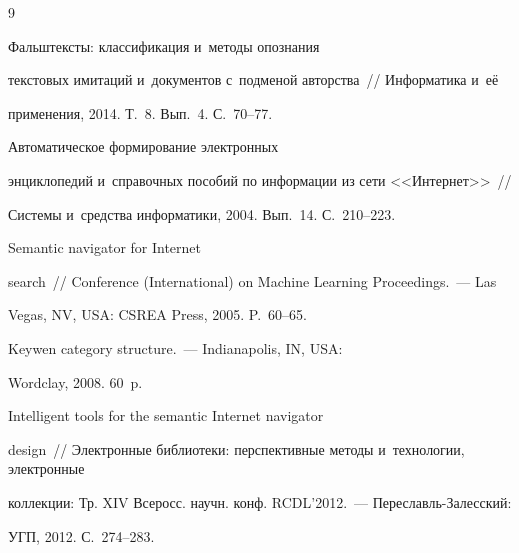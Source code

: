 {\small\frenchspacing

{%


\begin{thebibliography}{9}


      Фальштексты: классификация и~методы опознания 

текстовых имитаций и~документов с~подменой авторства~/\!\!/ Информатика и~её 

применения, 2014. Т.~8. Вып.~4. С.~70--77.




 Автоматическое формирование электронных 

энциклопедий и~справочных пособий по информации из сети <<Интернет>>~/\!\!/ 

Системы и~средства информатики, 2004. Вып.~14. С.~210--223.


      Semantic navigator for Internet 

search~/\!\!/ Conference (International) on Machine Learning Proceedings.~--- Las 

Vegas, NV, USA: CSREA Press, 2005. P.~60--65.


      Keywen category structure.~--- Indianapolis, IN, USA: 

Wordclay, 2008. 60~p.

    


      Intelligent tools for the semantic Internet navigator 

design~/\!\!/ Электронные библиотеки: перспективные методы и~технологии, электронные 

коллекции: Тр. XIV Всеросс. научн. конф. RCDL'2012.~--- Пе\-ре\-славль-За\-лес\-ский: 

УГП, 2012. С.~274--283.




\end{thebibliography}}}
